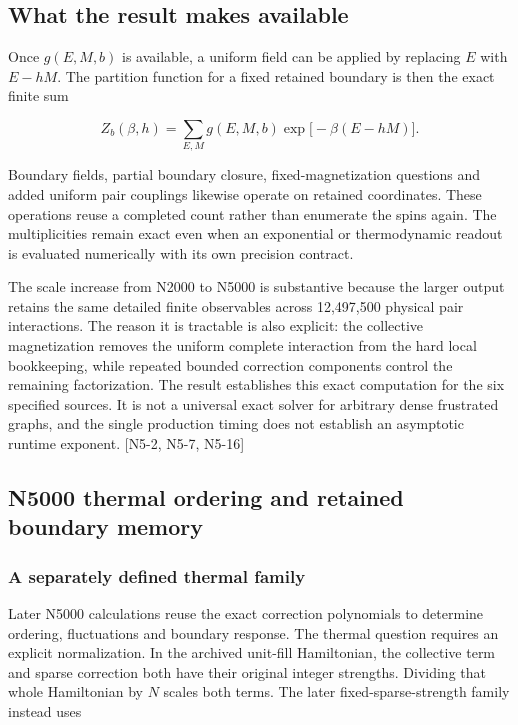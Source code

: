 \subsection{What the result makes available}\label{what-the-result-makes-available}

Once \(g(E,M,b)\) is available, a uniform field can be applied by replacing \(E\) with \(E-hM\). The partition function for a fixed retained boundary is then the exact finite sum

\[Z_b(\beta,h)=\sum_{E,M}g(E,M,b)\exp\!\bigl[-\beta(E-hM)\bigr].\]

Boundary fields, partial boundary closure, fixed-magnetization questions and added uniform pair couplings likewise operate on retained coordinates. These operations reuse a completed count rather than enumerate the spins again. The multiplicities remain exact even when an exponential or thermodynamic readout is evaluated numerically with its own precision contract.

The scale increase from N2000 to N5000 is substantive because the larger output retains the same detailed finite observables across 12,497,500 physical pair interactions. The reason it is tractable is also explicit: the collective magnetization removes the uniform complete interaction from the hard local bookkeeping, while repeated bounded correction components control the remaining factorization. The result establishes this exact computation for the six specified sources. It is not a universal exact solver for arbitrary dense frustrated graphs, and the single production timing does not establish an asymptotic runtime exponent. {[}N5-2, N5-7, N5-16{]}

\subsection{N5000 thermal ordering and retained boundary memory}\label{n5000-thermal-ordering-and-retained-boundary-memory}

\subsubsection{A separately defined thermal family}\label{a-separately-defined-thermal-family}

Later N5000 calculations reuse the exact correction polynomials to determine ordering, fluctuations and boundary response. The thermal question requires an explicit normalization. In the archived unit-fill Hamiltonian, the collective term and sparse correction both have their original integer strengths. Dividing that whole Hamiltonian by \(N\) scales both terms. The later fixed-sparse-strength family instead uses

